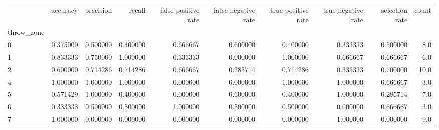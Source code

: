 \begin{tabular}{lrrrrrrrrr}
\toprule
{} &  accuracy &  precision &    recall &  false positive rate &  false negative rate &  true positive rate &  true negative rate &  selection rate &  count \\
throw\_zone &           &            &           &                      &                      &                     &                     &                 &        \\
\midrule
0          &  0.375000 &   0.500000 &  0.400000 &             0.666667 &             0.600000 &            0.400000 &            0.333333 &        0.500000 &    8.0 \\
1          &  0.833333 &   0.750000 &  1.000000 &             0.333333 &             0.000000 &            1.000000 &            0.666667 &        0.666667 &    6.0 \\
2          &  0.600000 &   0.714286 &  0.714286 &             0.666667 &             0.285714 &            0.714286 &            0.333333 &        0.700000 &   10.0 \\
4          &  1.000000 &   1.000000 &  1.000000 &             0.000000 &             0.000000 &            1.000000 &            1.000000 &        0.666667 &    3.0 \\
5          &  0.571429 &   1.000000 &  0.400000 &             0.000000 &             0.600000 &            0.400000 &            1.000000 &        0.285714 &    7.0 \\
6          &  0.333333 &   0.500000 &  0.500000 &             1.000000 &             0.500000 &            0.500000 &            0.000000 &        0.666667 &    3.0 \\
7          &  1.000000 &   0.000000 &  0.000000 &             0.000000 &             0.000000 &            0.000000 &            1.000000 &        0.000000 &    9.0 \\
\bottomrule
\end{tabular}
